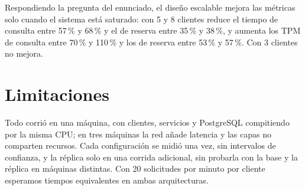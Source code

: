 \documentclass[10pt, a4paper]{article}
\begin{document}
	Respondiendo la pregunta del enunciado, el diseño escalable mejora las métricas solo cuando el sistema está saturado: con 5 y 8 clientes reduce el tiempo de consulta entre 57\,\% y 68\,\% y el de reserva entre 35\,\% y 38\,\%, y aumenta los TPM de consulta entre 70\,\% y 110\,\% y los de reserva entre 53\,\% y 57\,\%. Con 3 clientes no mejora.

	\section{Limitaciones}
	\label{sec:limites}

	Todo corrió en una máquina, con clientes, servicios y PostgreSQL compitiendo por la misma CPU; en tres máquinas la red añade latencia y las capas no comparten recursos. Cada configuración se midió una vez, sin intervalos de confianza, y la réplica solo en una corrida adicional, sin probarla con la base y la réplica en máquinas distintas. Con 20 solicitudes por minuto por cliente esperamos tiempos equivalentes en ambas arquitecturas.
\end{document}
